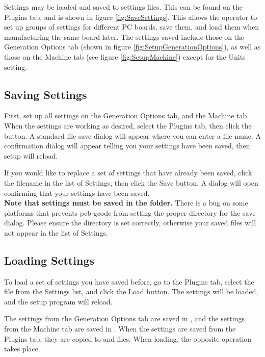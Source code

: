 \documentclass[11pt]{book}
\begin{document}
Settings may be loaded and saved to settings files. This can be found on the Plugins tab, and is shown in figure \vref{fig:SaveSettings}. This allows the operator to set up groups of settings for different PC boards, save them, and load them when manufacturing the same board later. The settings saved include those on the Generation Options tab (shown in figure \vref{fig:SetupGenerationOptions}), as well as those on the Machine tab (see figure \vref{fig:SetupMachine}) except for the Units setting.

\subsection{Saving Settings}

First, set up all settings on the Generation Options tab, and the Machine tab. When the settings are working as desired, select the Plugins tab, then click the  button. A standard file save dialog will appear where you can enter a file name. A confirmation dialog will appear telling you your settings have been saved, then setup will reload.

If you would like to replace a set of settings that have already been saved, click the filename in the list of Settings, then click the Save button. A dialog will open confirming that your settings have been saved.
\\

\textbf{Note that settings must be saved in the  folder.}
There is a bug on some platforms that prevents pcb-gcode from setting the proper directory for the save dialog. Please ensure the directory is set correctly, otherwise your saved files will not appear in the list of Settings.
\\

\subsection{Loading Settings}

To load a set of settings you have saved before, go to the Plugins tab, select the file from the Settings list, and click the Load button. The settings will be loaded, and the setup program will reload.

The settings from the Generation Options tab are saved in , and the settings from the Machine tab are saved in . When the settings are saved from the Plugins tab, they are copied to  and  files. When loading, the opposite operation takes place.
\end{document}
